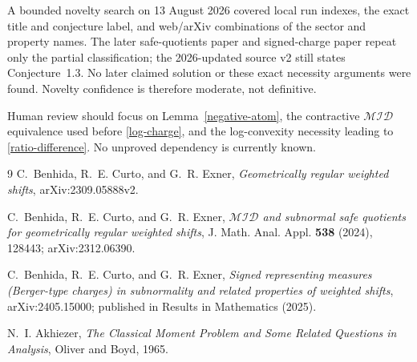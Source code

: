 \documentclass[11pt]{article}
\newcommand{\MID}{\mathcal{MID}}
\begin{document}
A bounded novelty search on 13 August 2026 covered local run indexes, the
exact title and conjecture label, and web/arXiv combinations of the sector and
property names.  The later safe-quotients paper \cite{SafeQuotients} and
signed-charge paper \cite{Charges} repeat only the partial classification;
the 2026-updated source v2 still states Conjecture~1.3.  No later claimed
solution or these exact necessity arguments were found.  Novelty confidence
is therefore moderate, not definitive.

Human review should focus on Lemma~\ref{negative-atom}, the contractive
$\MID$ equivalence used before \eqref{log-charge}, and the log-convexity
necessity leading to \eqref{ratio-difference}.  No unproved dependency is
currently known.

\begin{thebibliography}{9}
C.~Benhida, R.~E. Curto, and G.~R. Exner,
\emph{Geometrically regular weighted shifts}, arXiv:2309.05888v2.

C.~Benhida, R.~E. Curto, and G.~R. Exner,
\emph{$\mathcal{MID}$ and subnormal safe quotients for geometrically regular
weighted shifts}, J. Math. Anal. Appl. \textbf{538} (2024), 128443;
arXiv:2312.06390.

C.~Benhida, R.~E. Curto, and G.~R. Exner,
\emph{Signed representing measures (Berger-type charges) in subnormality and
related properties of weighted shifts}, arXiv:2405.15000; published in
Results in Mathematics (2025).

N.~I. Akhiezer, \emph{The Classical Moment Problem and Some Related Questions
in Analysis}, Oliver and Boyd, 1965.
\end{thebibliography}
\end{document}
